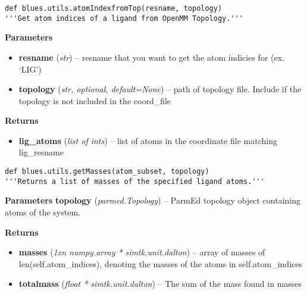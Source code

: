 \begin{description}
\begin{verbatim}
def blues.utils.atomIndexfromTop(resname, topology)
'''Get atom indices of a ligand from OpenMM Topology.'''
\end{verbatim}

\begin{description}
\item
    \textbf{Parameters}
\begin{itemize}
\item
  \textbf{resname} (\emph{str}) -- resname that you want to get the atom
  indicies for (ex. `LIG')
\item
  \textbf{topology} (\emph{str, optional, default=None}) -- path of
  topology file. Include if the topology is not included in the
  coord\_file
\end{itemize}
\item
    \textbf{Returns}
\begin{itemize}
    \item
        \textbf{lig\_atoms} (\emph{list of ints}) -- list of atoms in the coordinate file matching lig\_resname
\end{itemize}
\end{description}
\end{description}

\begin{description}
\begin{verbatim}
def blues.utils.getMasses(atom_subset, topology)
'''Returns a list of masses of the specified ligand atoms.'''
\end{verbatim}

\begin{description}
\item
    \textbf{Parameters}
\textbf{topology} (\emph{parmed.Topology}) -- ParmEd topology object
containing atoms of the system.
\item
    \textbf{Returns}
\begin{itemize}
\item
  \textbf{masses} (\emph{1xn numpy.array * simtk.unit.dalton}) -- array
  of masses of len(self.atom\_indices), denoting the masses of the atoms
  in self.atom\_indices
\item
  \textbf{totalmass} (\emph{float * simtk.unit.dalton}) -- The sum of
  the mass found in masses
\end{itemize}
\end{description}
\end{description}

